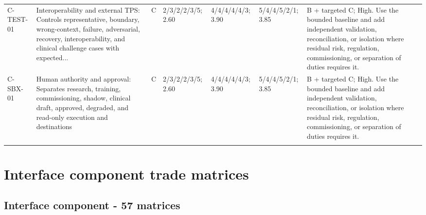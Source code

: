 \documentclass[11pt,letterpaper]{article}
\begin{document}
\begin{scriptsize}
\begin{longtable}{@{}L{0.11\textwidth}L{0.165\textwidth}L{0.04\textwidth}L{0.115\textwidth}L{0.115\textwidth}L{0.115\textwidth}L{0.235\textwidth}@{}}
\addlinespace[2pt]
C-TEST-01 & Interoperability and external TPS: Controls representative, boundary, wrong-context, failure, adversarial, recovery, interoperability, and clinical challenge cases with expected... & C & 2/3/2/2/3/5; 2.60 & 4/4/4/4/4/3; 3.90 & 5/4/4/5/2/1; 3.85 & B + targeted C; High. Use the bounded baseline and add independent validation, reconciliation, or isolation where residual risk, regulation, commissioning, or separation of duties requires it. \\
\addlinespace[2pt]
C-SBX-01 & Human authority and approval: Separates research, training, commissioning, shadow, clinical draft, approved, degraded, and read-only execution and destinations & C & 2/3/2/2/3/5; 2.60 & 4/4/4/4/4/3; 3.90 & 5/4/4/5/2/1; 3.85 & B + targeted C; High. Use the bounded baseline and add independent validation, reconciliation, or isolation where residual risk, regulation, commissioning, or separation of duties requires it. \\
\addlinespace[2pt]
\end{longtable}
\end{scriptsize}

\section{Interface component trade matrices}

\subsection{Interface component - 57 matrices}
\end{document}
